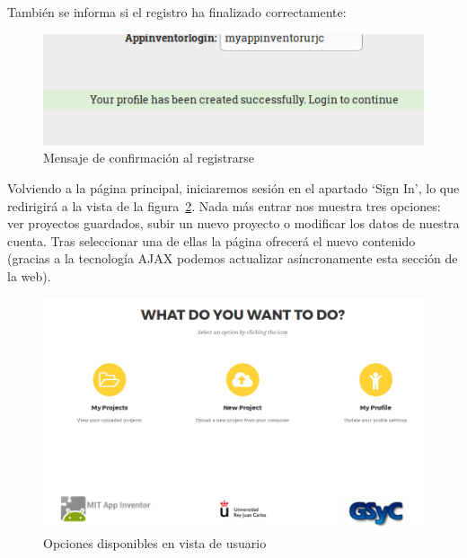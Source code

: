 \documentclass[a4paper, 12pt]{book}
\begin{document}
También se informa si el registro ha finalizado correctamente:
\begin{figure}[H]
  \centering
  \includegraphics[width=0.70\linewidth, keepaspectratio]{img/createUserOK}
  \caption{Mensaje de confirmación al registrarse}
  \label{fig:createUserOK}
\end{figure}

Volviendo a la página principal, iniciaremos sesión en el apartado `Sign In', lo que redirigirá a la vista de la figura~\ref{fig:userView}. Nada más entrar nos muestra tres opciones: ver proyectos guardados, subir un nuevo proyecto o modificar los datos de nuestra cuenta. Tras seleccionar una de ellas la página ofrecerá el nuevo contenido (gracias a la tecnología AJAX podemos actualizar asíncronamente esta sección de la web).
\begin{figure}[H]
  \centering
  \includegraphics[width=0.90\linewidth, keepaspectratio]{img/userView}
  \caption{Opciones disponibles en vista de usuario}
  \label{fig:userView}
\end{figure}
\end{document}
